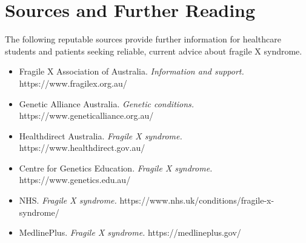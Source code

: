 \section*{Sources and Further Reading}
The following reputable sources provide further information for healthcare students and patients seeking reliable, current advice about fragile X syndrome.
\begin{itemize}
    \item Fragile X Association of Australia. \textit{Information and support.} https://www.fragilex.org.au/
    \item Genetic Alliance Australia. \textit{Genetic conditions.} https://www.geneticalliance.org.au/
    \item Healthdirect Australia. \textit{Fragile X syndrome.} https://www.healthdirect.gov.au/
    \item Centre for Genetics Education. \textit{Fragile X syndrome.} https://www.genetics.edu.au/
    \item NHS. \textit{Fragile X syndrome.} https://www.nhs.uk/conditions/fragile-x-syndrome/
    \item MedlinePlus. \textit{Fragile X syndrome.} https://medlineplus.gov/
\end{itemize}
